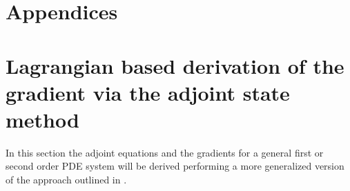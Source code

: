 \documentclass[10pt]{SelfArx} %
\theoremstyle{definition}
\begin{document}






\appendix
\section*{Appendices}
\section{Lagrangian based derivation of the gradient via the adjoint state method}\label{sec:general_math}
In this section the adjoint equations and the gradients for a general first or second order PDE system will be derived performing a more generalized version of the approach outlined in \cite{Bradley2012}.
\end{document}
